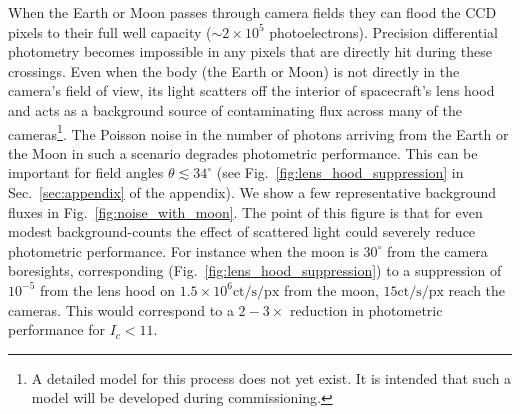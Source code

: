 When the Earth or Moon passes through \tesss camera fields they can
flood the CCD pixels to their full well capacity ($\sim2\times10^5$
photoelectrons).  Precision differential photometry becomes impossible
in any pixels that are directly hit during these crossings.  Even when
the body (the Earth or Moon) is not directly in the camera's field of
view, its light scatters off the interior of spacecraft's lens hood
and acts as a background source of contaminating flux across many of
the cameras\footnote{A detailed model for this process does not yet
  exist. It is intended that such a model will be developed during
  commissioning.}.  The Poisson noise in the number of photons
arriving from the Earth or the Moon in such a scenario degrades \tesss
photometric performance.  This can be important for field angles
$\theta \lesssim34^{\circ}$ (see Fig.~\ref{fig:lens_hood_suppression}
in Sec.~\ref{sec:appendix} of the appendix).  We show a few
representative background fluxes in Fig.~\ref{fig:noise_with_moon}.
The point of this figure is that for even modest background-counts the
effect of scattered light could severely reduce \tesss photometric
performance.  For instance when the moon is $30^\circ$ from the camera
boresights, corresponding (Fig.~\ref{fig:lens_hood_suppression}) to a
suppression of $10^{-5}$ from the lens hood on
$1.5\times10^6\mathrm{ct/s/px}$ from the moon, $15\mathrm{ct/s/px}$
reach the cameras.  This would correspond to a $2-3\times$ reduction
in photometric performance for $I_c < 11$.

